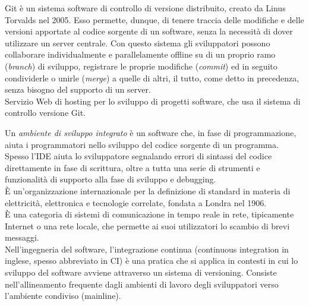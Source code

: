 \documentclass{scalatekids-article}
\begin{document}

 Git è un sistema software di controllo di versione distribuito, creato da Linus Torvalds nel 2005.
Esso permette, dunque, di tenere traccia delle modifiche e delle versioni apportate al codice sorgente di un software, senza la necessità di dover utilizzare un server centrale.
Con questo sistema gli sviluppatori possono collaborare individualmente e parallelamente offline su di un proprio ramo (\textit{branch}) di sviluppo, registrare le proprie modifiche (\textit{commit}) ed in seguito condividerle o unirle (\textit{merge}) a quelle di altri, il tutto, come detto in precedenza, senza bisogno del supporto di un server.
\\

 Servizio Web di hosting per lo sviluppo di progetti software, che usa il sistema di controllo  versione Git.
\\



 Un \textit{ambiente di sviluppo integrato} è un software che, in fase di programmazione, aiuta i programmatori nello sviluppo del codice sorgente di un programma. Spesso l'IDE aiuta lo sviluppatore segnalando errori di sintassi del codice direttamente in fase di scrittura, oltre a tutta una serie di strumenti e funzionalità di supporto alla fase di sviluppo e debugging.
\\

 È un'organizzazione internazionale per la definizione di standard in materia di elettricità, elettronica e tecnologie correlate, fondata a Londra nel 1906.
\\

 È una categoria di sistemi di comunicazione in tempo reale in rete, tipicamente Internet o una rete locale, che permette ai suoi utilizzatori lo scambio di brevi messaggi.
\\

 Nell'ingegneria del software, l'integrazione continua (continuous integration in inglese, spesso abbreviato in CI) è una pratica che si applica in contesti in cui lo sviluppo del software avviene attraverso un sistema di versioning. Consiste nell'allineamento frequente dagli ambienti di lavoro degli sviluppatori verso l'ambiente condiviso (mainline).
\\
\end{document}
